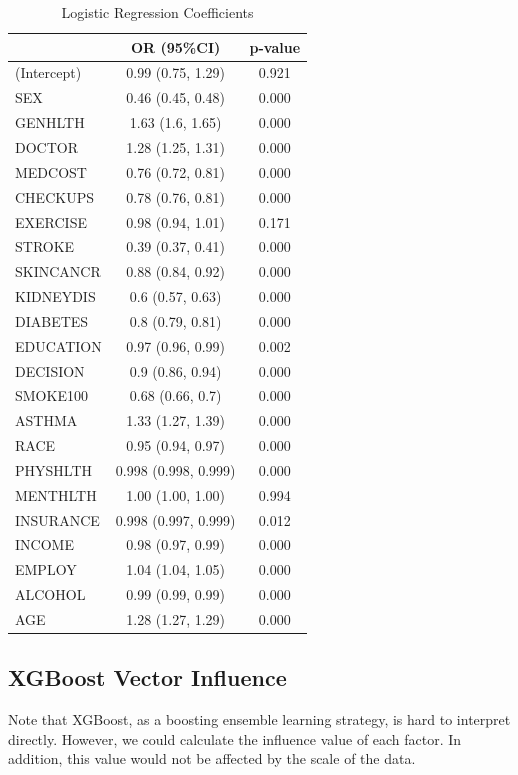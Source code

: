 \documentclass[11pt]{article}
\begin{document}
\begin{table}
    \centering
    \caption{Logistic Regression Coefficients}
    \label{lrcoef}
    \begin{tabular}{lcc}
        \hline
        ~ & OR (95\%CI) & p-value  \\ 
        \hline
        (Intercept) & 0.99 (0.75, 1.29) & 0.921   \\ 
        SEX & 0.46 (0.45, 0.48) & 0.000   \\ 
        GENHLTH & 1.63 (1.6, 1.65) & 0.000   \\ 
        DOCTOR & 1.28 (1.25, 1.31) & 0.000   \\ 
        MEDCOST & 0.76 (0.72, 0.81) & 0.000   \\ 
        CHECKUPS & 0.78 (0.76, 0.81) & 0.000   \\ 
        EXERCISE & 0.98 (0.94, 1.01) & 0.171   \\ 
        STROKE & 0.39 (0.37, 0.41) & 0.000   \\ 
        SKINCANCR & 0.88 (0.84, 0.92) & 0.000   \\ 
        KIDNEYDIS & 0.6 (0.57, 0.63) & 0.000   \\ 
        DIABETES & 0.8 (0.79, 0.81) & 0.000   \\ 
        EDUCATION & 0.97 (0.96, 0.99) & 0.002   \\ 
        DECISION & 0.9 (0.86, 0.94) & 0.000   \\ 
        SMOKE100 & 0.68 (0.66, 0.7) & 0.000   \\ 
        ASTHMA & 1.33 (1.27, 1.39) & 0.000   \\ 
        RACE & 0.95 (0.94, 0.97) & 0.000   \\ 
        PHYSHLTH & 0.998 (0.998, 0.999) & 0.000   \\ 
        MENTHLTH & 1.00 (1.00, 1.00) & 0.994   \\ 
        INSURANCE & 0.998 (0.997, 0.999) & 0.012   \\ 
        INCOME & 0.98 (0.97, 0.99) & 0.000   \\ 
        EMPLOY & 1.04 (1.04, 1.05) & 0.000   \\ 
        ALCOHOL & 0.99 (0.99, 0.99) & 0.000   \\ 
        AGE & 1.28 (1.27, 1.29) & 0.000   \\ 
        \hline
    \end{tabular}
\end{table}

\subsection{XGBoost Vector Influence}
Note that XGBoost, as a boosting ensemble learning strategy, is hard to interpret directly. However, we could calculate the influence value of each factor. In addition, this value would not be affected by the scale of the data. 
\end{document}
